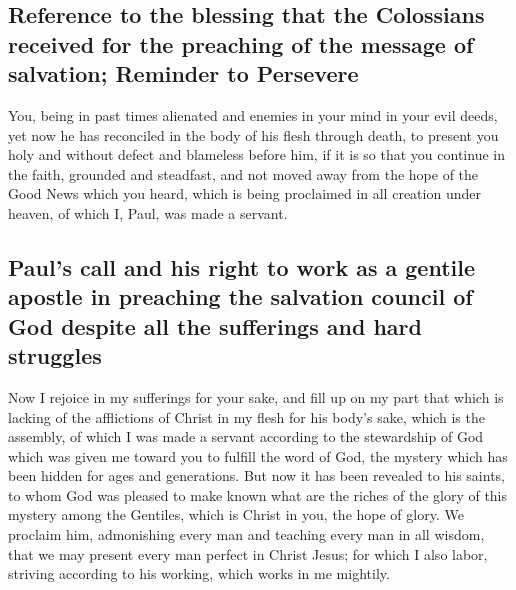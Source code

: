 \hypertarget{reference-to-the-blessing-that-the-colossians-received-for-the-preaching-of-the-message-of-salvation-reminder-to-persevere}{%
\subsection{Reference to the blessing that the Colossians received for
the preaching of the message of salvation; Reminder to
Persevere}\label{reference-to-the-blessing-that-the-colossians-received-for-the-preaching-of-the-message-of-salvation-reminder-to-persevere}}

 You, being in past times alienated and enemies in your
mind in your evil deeds,  yet now he has reconciled in
the body of his flesh through death, to present you holy and without
defect and blameless before him,  if it is so that you
continue in the faith, grounded and steadfast, and not moved away from
the hope of the Good News which you heard, which is being proclaimed in
all creation under heaven, of which I, Paul, was made a servant.

\hypertarget{pauls-call-and-his-right-to-work-as-a-gentile-apostle-in-preaching-the-salvation-council-of-god-despite-all-the-sufferings-and-hard-struggles}{%
\subsection{Paul's call and his right to work as a gentile apostle in
preaching the salvation council of God despite all the sufferings and
hard
struggles}\label{pauls-call-and-his-right-to-work-as-a-gentile-apostle-in-preaching-the-salvation-council-of-god-despite-all-the-sufferings-and-hard-struggles}}

 Now I rejoice in my sufferings for your sake, and fill
up on my part that which is lacking of the afflictions of Christ in my
flesh for his body's sake, which is the assembly,  of
which I was made a servant according to the stewardship of God which was
given me toward you to fulfill the word of God,  the
mystery which has been hidden for ages and generations. But now it has
been revealed to his saints,  to whom God was pleased to
make known what are the riches of the glory of this mystery among the
Gentiles, which is Christ in you, the hope of glory.  We
proclaim him, admonishing every man and teaching every man in all
wisdom, that we may present every man perfect in Christ Jesus;
 for which I also labor, striving according to his
working, which works in me mightily.

